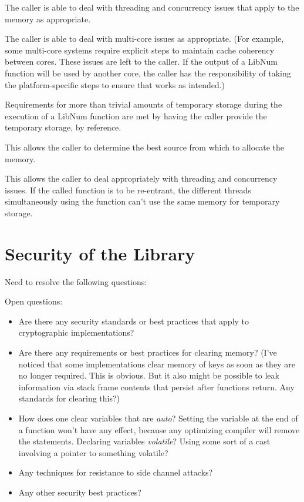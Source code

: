 The caller is able to deal with threading and concurrency issues that
apply to the memory as appropriate.

The caller is able to deal with multi-core issues as appropriate.
(For example, some multi-core systems require explicit steps to maintain
cache coherency between cores. These issues are left to the caller.
If the output of a LibNum function will be used by another core, the
caller has the responsibility of taking the platform-specific steps to
ensure that works as intended.)

Requirements for more than trivial amounts of temporary storage during
the execution of a LibNum function are met by having the caller provide
the temporary storage, by reference.

This allows the caller to determine the best source from which to allocate
the memory.

This allows the caller to deal appropriately with threading and
concurrency issues. If the called function is to be re-entrant, the
different threads simultaneously using the function can't use the same
memory for temporary storage.


\section{Security of the Library}
\label{cldd0:sstl0}

Need to resolve the following questions:

Open questions:

\begin{itemize}
\item Are there any security standards or best practices
      that apply to cryptographic implementations?
\item Are there any requirements or best practices for 
      clearing memory? (I've noticed
      that some implementations clear memory of
      keys as soon as they
      are no longer required.  This is obvious.
      But it also might be
      possible to leak information via stack frame
      contents that persist
      after functions return.  Any standards for
      clearing this?)
\item How does one clear variables that are \emph{auto}?
      Setting the variable at the end of a function won't 
      have any effect, because any optimizing compiler will 
      remove the statements.  Declaring variables 
      \emph{volatile}?  Using some sort of a cast involving 
      a pointer to something volatile?
\item Any techniques for resistance to side channel 
      attacks?
\item Any other security best practices?
\end{itemize}

